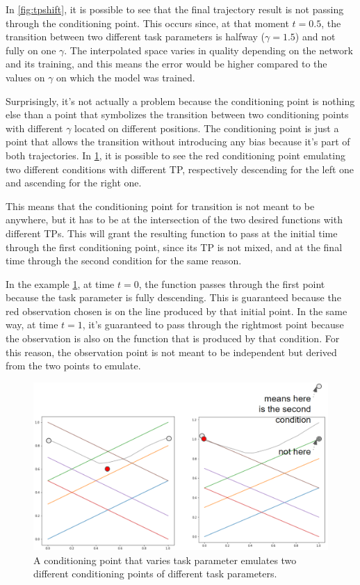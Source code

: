 In \cref{fig:tpshift}, it is possible to see that the final trajectory result is not passing through the conditioning point. This occurs since, at that moment $t=0.5$, the transition between two different task parameters is halfway ($\gamma=1.5$) and not fully on one $\gamma$. The interpolated space varies in quality depending on the network and its training, and this means the error would be higher compared to the values on $\gamma$ on which the model was trained. 

Surprisingly, it's not actually a problem because the conditioning point is nothing else than a point that symbolizes the transition between two conditioning points with different $\gamma$ located on different positions. The conditioning point is just a point that allows the transition without introducing any bias because it's part of both trajectories. In \cref{fig:tp-condition-point-meaning}, it is possible to see the red conditioning point emulating two different conditions with different TP, respectively descending for the left one and ascending for the right one.

This means that the conditioning point for transition is not meant to be anywhere, but it has to be at the intersection of the two desired functions with different TPs. This will grant the resulting function to pass at the initial time through the first conditioning point, since its TP is not mixed, and at the final time through the second condition for the same reason. 

In the example \cref{fig:tp-condition-point-meaning}, at time $t=0$, the function passes through the first point because the task parameter is fully descending. This is guaranteed because the red observation chosen is on the line produced by that initial point. In the same way, at time $t=1$, it's guaranteed to pass through the rightmost point because the observation is also on the function that is produced by that condition. 
For this reason, the observation point is not meant to be independent but derived from the two points to emulate.

\begin{figure}
    \centering
    \includegraphics[width=0.8\linewidth]{figures/tp-condition-point-meaning.png}
    \caption{ A conditioning point that varies task parameter emulates two different conditioning points of different task parameters. }
    \label{fig:tp-condition-point-meaning}
\end{figure}

